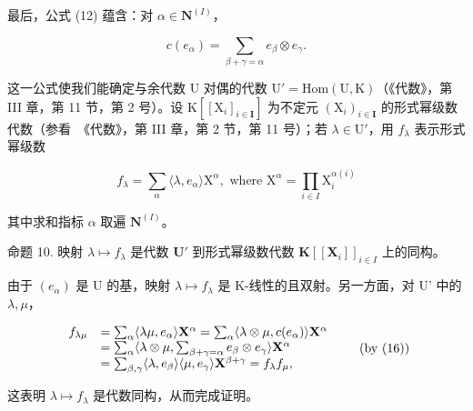 最后，公式 (12) 蕴含：对 \(\alpha \in \mathbf{N}^{(I)}\)，

\[
c (e _ {\alpha}) = \sum_ {\beta + \gamma = \alpha} e _ {\beta} \otimes e _ {\gamma}.\tag{16}
\]

这一公式使我们能确定与余代数 U 对偶的代数 \(\mathrm{U}' = \mathrm{Hom}(\mathrm{U},\mathrm{K})\)（《代数》，第 III 章，第 11 节，第 2 号）。设 \(\mathrm{K}[[\mathrm{X}_i]_{i\in \mathbf{I}}]\) 为不定元 \((\mathrm{X}_i)_{i\in \mathbf{I}}\) 的形式幂级数代数（参看~《代数》，第 III 章，第 2 节，第 11 号）；若 \(\lambda \in \mathrm{U}'\)，用 \(f_{\lambda}\) 表示形式幂级数

\[
f _ {\lambda} = \sum_ {\alpha} \langle \lambda , e _ {\alpha} \rangle \mathrm{X} ^ {\alpha}, \text { where } \mathrm{X} ^ {\alpha} = \prod_ {i \in I} \mathrm{X} _ {i} ^ {\alpha (i)}
\]

其中求和指标 \(\alpha\) 取遍 \(\mathbf{N}^{(I)}\)。

命题 10. 映射 \(\lambda \mapsto f_{\lambda}\) 是代数 \(\mathbf{U}'\) 到形式幂级数代数 \(\mathbf{K}[[\mathbf{X}_i]]_{i \in I}\) 上的同构。

由于 \((e_{\alpha})\) 是 U 的基，映射 \(\lambda \mapsto f_{\lambda}\) 是 K-线性的且双射。另一方面，对 U' 中的 \(\lambda, \mu\)，

\[
\begin{array}{r l} f _ {\lambda \mu} & = \sum_ {\alpha} \langle \lambda \mu , e _ {\alpha} \rangle \mathbf {X} ^ {\alpha} = \sum_ {\alpha} \langle \lambda \otimes \mu , c (e _ {\alpha}) \rangle \mathbf {X} ^ {\alpha} \\ & = \sum_ {\alpha} \langle \lambda \otimes \mu , \sum_ {\beta + \gamma = \alpha} e _ {\beta} \otimes e _ {\gamma} \rangle \mathbf {X} ^ {\alpha} \\ & = \sum_ {\beta , \gamma} \langle \lambda , e _ {\beta} \rangle \langle \mu , e _ {\gamma} \rangle \mathbf {X} ^ {\beta + \gamma} = f _ {\lambda} f _ {\mu}, \end{array}\tag{by (16)}
\]

这表明 \(\lambda \mapsto f_{\lambda}\) 是代数同构，从而完成证明。


